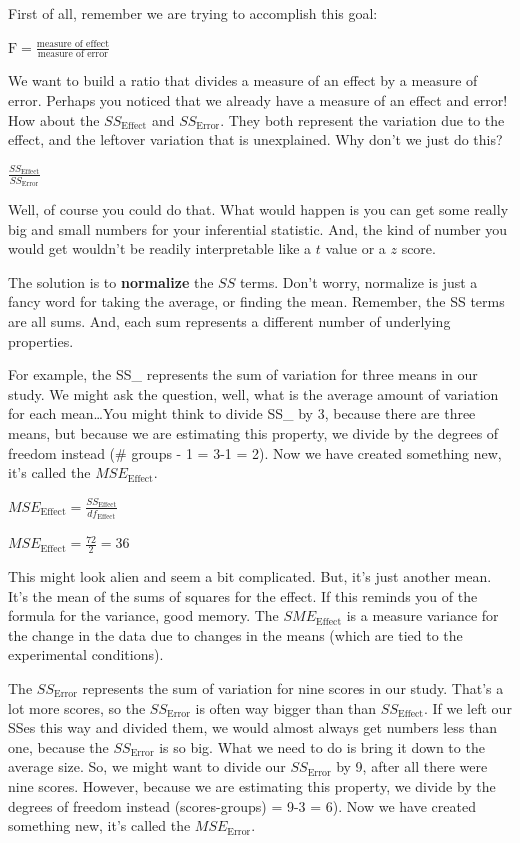 \documentclass[]{book}
\begin{document}
First of all, remember we are trying to accomplish this goal:

\(\text{F} = \frac{\text{measure of effect}}{\text{measure of error}}\)

We want to build a ratio that divides a measure of an effect by a measure of error. Perhaps you noticed that we already have a measure of an effect and error! How about the \(SS_\text{Effect}\) and \(SS_\text{Error}\). They both represent the variation due to the effect, and the leftover variation that is unexplained. Why don't we just do this?

\(\frac{SS_\text{Effect}}{SS_\text{Error}}\)

Well, of course you could do that. What would happen is you can get some really big and small numbers for your inferential statistic. And, the kind of number you would get wouldn't be readily interpretable like a \(t\) value or a \(z\) score.

The solution is to \textbf{normalize} the \(SS\) terms. Don't worry, normalize is just a fancy word for taking the average, or finding the mean. Remember, the SS terms are all sums. And, each sum represents a different number of underlying properties.

For example, the SS\_ represents the sum of variation for three means in our study. We might ask the question, well, what is the average amount of variation for each mean\ldots{}You might think to divide SS\_ by 3, because there are three means, but because we are estimating this property, we divide by the degrees of freedom instead (\# groups - 1 = 3-1 = 2). Now we have created something new, it's called the \(MSE_\text{Effect}\).

\(MSE_\text{Effect} = \frac{SS_\text{Effect}}{df_\text{Effect}}\)

\(MSE_\text{Effect} = \frac{72}{2} = 36\)

This might look alien and seem a bit complicated. But, it's just another mean. It's the mean of the sums of squares for the effect. If this reminds you of the formula for the variance, good memory. The \(SME_\text{Effect}\) is a measure variance for the change in the data due to changes in the means (which are tied to the experimental conditions).

The \(SS_\text{Error}\) represents the sum of variation for nine scores in our study. That's a lot more scores, so the \(SS_\text{Error}\) is often way bigger than than \(SS_\text{Effect}\). If we left our SSes this way and divided them, we would almost always get numbers less than one, because the \(SS_\text{Error}\) is so big. What we need to do is bring it down to the average size. So, we might want to divide our \(SS_\text{Error}\) by 9, after all there were nine scores. However, because we are estimating this property, we divide by the degrees of freedom instead (scores-groups) = 9-3 = 6). Now we have created something new, it's called the \(MSE_\text{Error}\).
\end{document}
